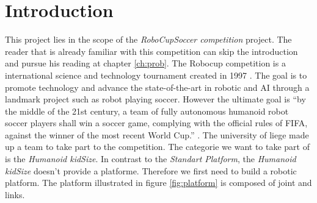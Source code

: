 \documentclass[12pt,a4paper]{report}
\begin{document}
\chapter{Introduction}
\label{ch:intro}
This project lies in the scope of the \emph{RoboCupSoccer competition} project. The reader that is already familiar with this competition can skip the introduction and pursue his reading at chapter \ref{ch:prob}.\newline
The Robocup competition is a international science and technology tournament created in 1997 \cite{robocupHistory}. The goal is to promote technology and advance the state-of-the-art in robotic and AI through a landmark project such as robot playing soccer. However the ultimate goal is ``by the middle of the 21st century, a team of fully autonomous humanoid robot soccer players shall win a soccer game, complying with the official rules of FIFA, against the winner of the most recent World Cup.'' \cite{RobocupObjective}.\newline
The university of liege made up a team to take part to the competition. The categorie we want to take part of is the \emph{Humanoid kidSize}. In contrast to the \emph{Standart Platform}, the \emph{Humanoid kidSize} doesn't provide a platforme. Therefore we first need to build a robotic platform. The platform illustrated in figure \ref{fig:platform} is composed of joint and links. 
\end{document}
